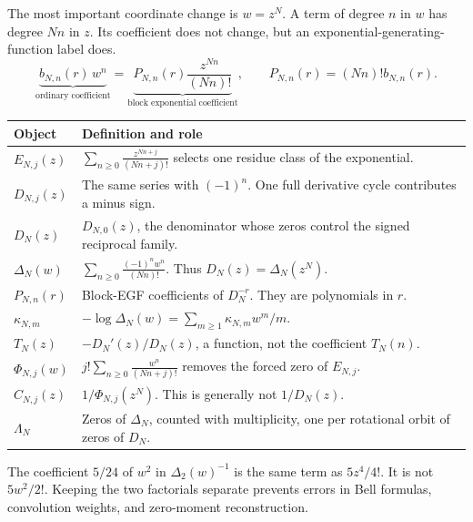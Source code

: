 The most important coordinate change is $w=z^N$. A term of degree $n$ in $w$ has degree $Nn$ in $z$. Its coefficient does not change, but an exponential-generating-function label does.
\[
\underbrace{b_{N,n}(r)\,w^n}_{\text{ordinary coefficient}}
=\underbrace{P_{N,n}(r)\frac{z^{Nn}}{(Nn)!}}_{\text{block exponential coefficient}},
\qquad P_{N,n}(r)=(Nn)!b_{N,n}(r).
\]
\par\noindent\begin{tabularx}{\linewidth}{@{}lY@{}}\toprule
Object & Definition and role\\\midrule
$E_{N,j}(z)$ & $\displaystyle\sum_{n\ge0}\frac{z^{Nn+j}}{(Nn+j)!}$ selects one residue class of the exponential.\\
$D_{N,j}(z)$ & The same series with $(-1)^n$. One full derivative cycle contributes a minus sign.\\
$D_N(z)$ & $D_{N,0}(z)$, the denominator whose zeros control the signed reciprocal family.\\
$\Delta_N(w)$ & $\displaystyle\sum_{n\ge0}\frac{(-1)^nw^n}{(Nn)!}$. Thus $D_N(z)=\Delta_N(z^N)$.\\
$P_{N,n}(r)$ & Block-EGF coefficients of $D_N^{-r}$. They are polynomials in $r$.\\
$\kappa_{N,m}$ & $\displaystyle-\log\Delta_N(w)=\sum_{m\ge1}\kappa_{N,m}w^m/m$.\\
$T_N(z)$ & $-D_N'(z)/D_N(z)$, a function, not the coefficient $T_N(n)$.\\
$\Phi_{N,j}(w)$ & $\displaystyle j!\sum_{n\ge0}\frac{w^n}{(Nn+j)!}$ removes the forced zero of $E_{N,j}$.\\
$C_{N,j}(z)$ & $1/\Phi_{N,j}(z^N)$. This is generally not $1/D_N(z)$.\\
$\Lambda_N$ & Zeros of $\Delta_N$, counted with multiplicity, one per rotational orbit of zeros of $D_N$.\\\bottomrule
\end{tabularx}
The coefficient $5/24$ of $w^2$ in $\Delta_2(w)^{-1}$ is the same term as $5z^4/4!$. It is not $5w^2/2!$. Keeping the two factorials separate prevents errors in Bell formulas, convolution weights, and zero-moment reconstruction.

